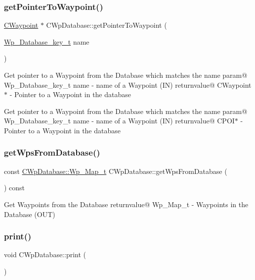 \subsubsection{\texorpdfstring{get\+Pointer\+To\+Waypoint()}{getPointerToWaypoint()}}
{\footnotesize\ttfamily \hyperlink{classCWaypoint}{C\+Waypoint} $\ast$ C\+Wp\+Database\+::get\+Pointer\+To\+Waypoint (\begin{DoxyParamCaption}\item[{\hyperlink{CWpDatabase_8h_af4bde7780fd7a000e6647ae788fe5a10}{Wp\+\_\+\+Database\+\_\+key\+\_\+t}}]{name }\end{DoxyParamCaption})}

Get pointer to a Waypoint from the Database which matches the name param@ Wp\+\_\+\+Database\+\_\+key\+\_\+t name -\/ name of a Waypoint (IN) returnvalue@ C\+Waypoint$\ast$ -\/ Pointer to a Waypoint in the database

Get pointer to a Waypoint from the Database which matches the name param@ Wp\+\_\+\+Database\+\_\+key\+\_\+t name -\/ name of a Waypoint (IN) returnvalue@ C\+P\+O\+I$\ast$ -\/ Pointer to a Waypoint in the database \mbox{\label{classCWpDatabase_ad264883102664dde8c25fa8f11e41087}} 
\subsubsection{\texorpdfstring{get\+Wps\+From\+Database()}{getWpsFromDatabase()}}
{\footnotesize\ttfamily const \hyperlink{classCWpDatabase_acdf43fd8206955eeb54807e9254958cb}{C\+Wp\+Database\+::\+Wp\+\_\+\+Map\+\_\+t} C\+Wp\+Database\+::get\+Wps\+From\+Database (\begin{DoxyParamCaption}{ }\end{DoxyParamCaption}) const}

Get Waypoints from the Database returnvalue@ Wp\+\_\+\+Map\+\_\+t -\/ Waypoints in the Database (O\+UT) \mbox{\label{classCWpDatabase_a14ca531b56bffb1dc354c5a688115d74}} 
\subsubsection{\texorpdfstring{print()}{print()}}
{\footnotesize\ttfamily void C\+Wp\+Database\+::print (\begin{DoxyParamCaption}{ }\end{DoxyParamCaption})}

